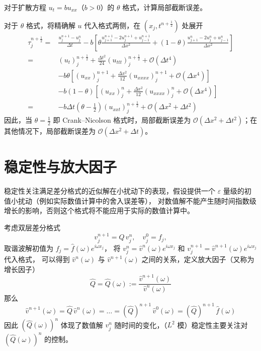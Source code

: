 \begin{example}
    对于扩散方程 $u_t = b u_{xx}$（$b>0$）的 $\theta$ 格式，计算局部截断误差。
\end{example}

\begin{solution*}
    对于 $\theta$ 格式，将精确解 $u$ 代入格式两侧，在 $(x_j,t^{n+\frac12})$ 处展开
    \begin{align*}
        \tau_j^{n+\frac12} ={} & \frac{u_j^{n+1}-u_j^n}{\Delta t} - b
        \left[
        \theta \frac{u_{j+1}^{n+1} - 2 u_j^{n+1} + u_{j-1}^{n+1}}{\Delta x^2}
        + (1-\theta) \frac{u_{j+1}^n - 2 u_j^n + u_{j-1}^n}{\Delta x^2}
        \right]                                                                                                                           \\
        ={}                    & (u_t)_j^{n+\frac12} + \frac{\Delta t^2}{24} (u_{ttt})_j^{n+\frac12} + \mathcal{O}(\Delta t^4)            \\
                               & - b \theta \left[
        (u_{xx})_{j}^{n+1} + \frac{\Delta x^2}{12} (u_{xxxx})_j^{n+1} + \mathcal{O}(\Delta x^4)
        \right]                                                                                                                           \\
                               & - b (1-\theta) \left[
        (u_{xx})_{j}^{n} + \frac{\Delta x^2}{12} (u_{xxxx})_j^{n} + \mathcal{O}(\Delta x^4)
        \right]
        \\
        ={}                    & -b \Delta t \left(\theta - \frac12\right) (u_{xxt})_j^{n+\frac12} + \mathcal{O}(\Delta x^2 + \Delta t^2)
    \end{align*}
    因此，当 $\theta = \frac12$ 即 Crank–Nicolson 格式时，局部截断误差为 $\mathcal{O}(\Delta x^2 + \Delta t^2)$；在其他情况下，局部截断误差为 $\mathcal{O}(\Delta x^2 + \Delta t)$。
\end{solution*}

\section{稳定性与放大因子}

稳定性关注满足差分格式的近似解在小扰动下的表现，假设提供一个 $\varepsilon$ 量级的初值小扰动（例如实际数值计算中的舍入误差等），
对数值解不能产生随时间指数级增长的影响，否则这个格式将不能应用于实际的数值计算中。

考虑双层差分格式
\[
    v_j^{n+1} = Q\,v_j^n,\quad v_j^0 = f_j,
\]
取谐波解初值为 $f_j = \hat{f}(\omega ) e^{i \omega  x_j}$，
将 $v_j^n =   \hat{v}^n(\omega ) e^{i \omega  x_j}$ 和 $v_j^{n+1} = \hat{v}^{n+1}(\omega ) e^{i \omega  x_j}$ 代入格式，
可以得到 $\hat{v}^n(\omega )$ 与 $\hat{v}^{n+1}(\omega )$ 之间的关系，定义放大因子（又称为增长因子）
\[
    \widehat{Q} = \widehat{Q}(\omega ) := \frac{\hat{v}^{n+1}(\omega )}{\hat{v}^n(\omega )}
\]
那么
\[
    \hat{v}^{n+1}(\omega ) = \widehat{Q}\, \hat{v}^n(\omega ) = \dots =  (\widehat{Q})^{n+1}\, \hat{v}^0(\omega ) = (\widehat{Q})^{n+1}\, \hat{f}(\omega )
\]
因此 $(\widehat{Q}(\omega))^{n}$ 体现了数值解 $v_j^n$ 随时间的变化，（$L^2$ 模）稳定性主要关注对 $(\widehat{Q}(\omega))^{n}$ 的控制。

